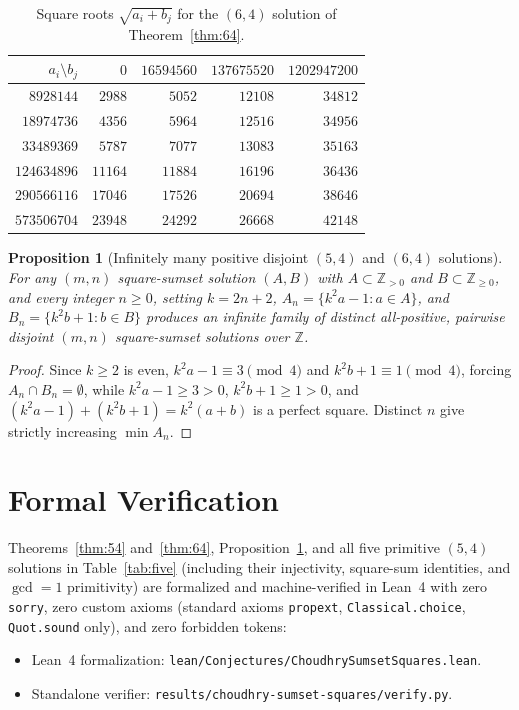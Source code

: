 \documentclass[11pt]{article}
\newtheorem{proposition}{Proposition}
\begin{document}
\begin{table}[ht]
\centering
\caption{Square roots $\sqrt{a_i + b_j}$ for the $(6, 4)$ solution of Theorem~\ref{thm:64}.}
\label{tab:64}
\begin{tabular}{rrrrr}
\toprule
$a_i \setminus b_j$ & $0$ & $16594560$ & $137675520$ & $1202947200$ \\
\midrule
$8928144$   & $2988$  & $5052$  & $12108$ & $34812$ \\
$18974736$  & $4356$  & $5964$  & $12516$ & $34956$ \\
$33489369$  & $5787$  & $7077$  & $13083$ & $35163$ \\
$124634896$ & $11164$ & $11884$ & $16196$ & $36436$ \\
$290566116$ & $17046$ & $17526$ & $20694$ & $38646$ \\
$573506704$ & $23948$ & $24292$ & $26668$ & $42148$ \\
\bottomrule
\end{tabular}
\end{table}

\begin{proposition}[Infinitely many positive disjoint $(5, 4)$ and $(6, 4)$ solutions]\label{prop:inf}
For any $(m, n)$ square-sumset solution $(A, B)$ with $A \subset \mathbb{Z}_{>0}$ and $B \subset \mathbb{Z}_{\ge 0}$, and every integer $n \ge 0$, setting $k = 2n + 2$, $A_n = \{k^2 a - 1 : a \in A\}$, and $B_n = \{k^2 b + 1 : b \in B\}$ produces an infinite family of distinct all-positive, pairwise disjoint $(m, n)$ square-sumset solutions over $\mathbb{Z}$.
\end{proposition}

\begin{proof}
Since $k \ge 2$ is even, $k^2 a - 1 \equiv 3 \pmod{4}$ and $k^2 b + 1 \equiv 1 \pmod{4}$, forcing $A_n \cap B_n = \emptyset$, while $k^2 a - 1 \ge 3 > 0$, $k^2 b + 1 \ge 1 > 0$, and $(k^2 a - 1) + (k^2 b + 1) = k^2(a + b)$ is a perfect square. Distinct $n$ give strictly increasing $\min A_n$.
\end{proof}

\section{Formal Verification}

Theorems~\ref{thm:54} and~\ref{thm:64}, Proposition~\ref{prop:inf}, and all five primitive $(5, 4)$ solutions in Table~\ref{tab:five} (including their injectivity, square-sum identities, and $\gcd = 1$ primitivity) are formalized and machine-verified in Lean~4 with zero \texttt{sorry}, zero custom axioms (standard axioms \texttt{propext}, \texttt{Classical.choice}, \texttt{Quot.sound} only), and zero forbidden tokens:
\begin{itemize}
\item Lean~4 formalization: \texttt{lean/Conjectures/ChoudhrySumsetSquares.lean}.
\item Standalone verifier: \texttt{results/choudhry-sumset-squares/verify.py}.
\end{itemize}
\end{document}

